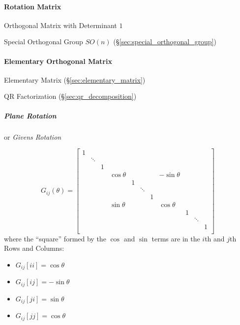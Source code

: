 \paragraph{Rotation Matrix}\label{sec:rotation_matrix}\hfill

Orthogonal Matrix with Determinant $1$

Special Orthogonal Group $SO(n)$ (\S\ref{sec:special_orthogonal_group})



\paragraph{Elementary Orthogonal Matrix}
\label{sec:elementary_orthogonal_matrix}\hfill

Elementary Matrix (\S\ref{sec:elementary_matrix})

QR Factorization (\S\ref{sec:qr_decomposition})



\subparagraph{Plane Rotation}\label{sec:plane_rotation}\hfill

or \emph{Givens Rotation}

\[
  G_{ij}(\theta) = \begin{bmatrix}
    1 &        &   &            &   &        &   &             &   &        &   \\
      & \ddots &   &            &   &        &   &             &   &        &   \\
      &        & 1 &            &   &        &   &             &   &        &   \\
      &        &   & \cos\theta &   &        &   & -\sin\theta &   &        &   \\
      &        &   &            & 1 &        &   &             &   &        &   \\
      &        &   &            &   & \ddots &   &             &   &        &   \\
      &        &   &            &   &        & 1 &             &   &        &   \\
      &        &   & \sin\theta &   &        &   & \cos\theta  &   &        &   \\
      &        &   &            &   &        &   &             & 1 &        &   \\
      &        &   &            &   &        &   &             &   & \ddots &   \\
      &        &   &            &   &        &   &             &   &        & 1 \\
  \end{bmatrix}
\]
where the ``square'' formed by the $\cos$ and $\sin$ terms are in the $i$th and
$j$th Rows and Columns:
\begin{itemize}
  \item $G_{ij}[ii] = \cos\theta$
  \item $G_{ij}[ij] = -\sin\theta$
  \item $G_{ij}[ji] = \sin\theta$
  \item $G_{ij}[jj] = \cos\theta$
\end{itemize}

